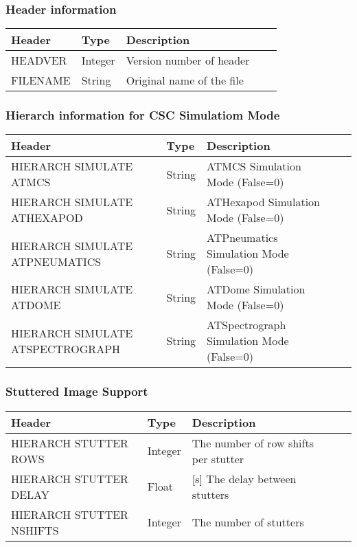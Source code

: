 \subsubsection{Header information}
\begin{tabular}{l l l l l}

\hline
Header & Type & Description \\
\hline
HEADVER & Integer & Version number of header \\
FILENAME & String & Original name of the file \\
\hline
\end{tabular}


\subsubsection{Hierarch information for CSC Simulatiom Mode}
\begin{tabular}{l l l l l}

\hline
Header & Type & Description \\
\hline
HIERARCH SIMULATE ATMCS & String & ATMCS Simulation Mode (False=0) \\
HIERARCH SIMULATE ATHEXAPOD & String & ATHexapod Simulation Mode (False=0) \\
HIERARCH SIMULATE ATPNEUMATICS & String & ATPneumatics Simulation Mode (False=0) \\
HIERARCH SIMULATE ATDOME & String & ATDome Simulation Mode (False=0) \\
HIERARCH SIMULATE ATSPECTROGRAPH & String & ATSpectrograph Simulation Mode (False=0) \\
\hline
\end{tabular}


\subsubsection{Stuttered Image Support}
\begin{tabular}{l l l l l}

\hline
Header & Type & Description \\
\hline
HIERARCH STUTTER ROWS & Integer & The number of row shifts per stutter \\
HIERARCH STUTTER DELAY & Float & [s] The delay between stutters \\
HIERARCH STUTTER NSHIFTS & Integer & The number of stutters \\
\hline
\end{tabular}

